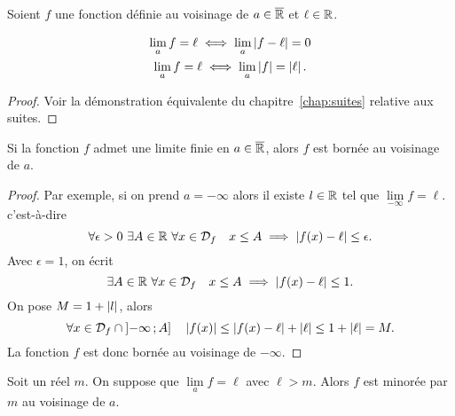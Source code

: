Soient $f$ une fonction définie au voisinage de $a \in \overline{\mathbb{R}}$ et $\ell \in \mathbb{R}$.
\begin{prop}
  \begin{gather}
    \lim\limits_{a} f = \ell \iff \lim\limits_{a} \left\lvert f-\ell\right\rvert = 0 \\ 
    \lim\limits_{a} f = \ell \iff \lim\limits_{a} \left\lvert f\right\rvert=\left\lvert\ell\right\rvert.
  \end{gather}
\end{prop}
\begin{proof}
  Voir la démonstration équivalente du chapitre~\ref{chap:suites} relative aux suites.
\end{proof}
\begin{prop}
  Si la fonction $f$ admet une limite finie en $a \in \overline{\mathbb{R}}$, alors $f$ est bornée au voisinage de $a$.
\end{prop}
\begin{proof}
  Par exemple, si on prend $a=-\infty$ alors il existe $l \in \mathbb{R}$ tel que $\lim\limits_{-\infty} f = \ell$. c'est-à-dire
  \begin{equation}
    \forall \epsilon >0 \ \exists A \in \R \ \forall x \in \Def{f} \quad x \leq A \implies \abs{f(x)-\ell} \leq \epsilon.
  \end{equation}
  Avec $\epsilon=1$, on écrit
  \begin{equation}
    \exists A \in \mathbb{R} \ \forall x \in \mathcal{D}_{f} \quad x \leq A \implies \left\lvert f(x)-\ell\right\rvert \leq 1.
  \end{equation}
  On pose $M=1+\left\lvert l\right\rvert$, alors
  \begin{equation}
    \forall x \in \mathcal{D}_{f} \cap \left] -\infty \, ;  A \right] \quad \left\lvert f(x)\right\rvert \leq \left\lvert f(x)-\ell\right\rvert+\left\lvert\ell\right\rvert \leq 1+\left\lvert\ell\right\rvert=M.
  \end{equation}
  La fonction $f$ est donc bornée au voisinage de $-\infty$.
\end{proof}
\begin{prop}
  Soit un réel $m$. On suppose que $\lim\limits_{a} f=\ell$ avec $\ell>m$. Alors $f$ est minorée par $m$ au voisinage de $a$.
\end{prop}
